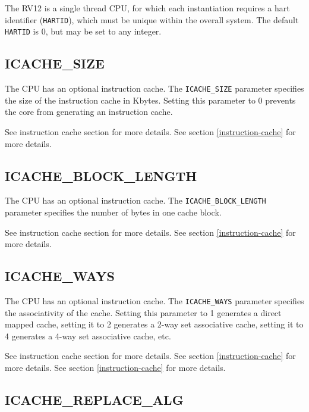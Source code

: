 The RV12 is a single thread CPU, for which each instantiation requires a hart
identifier (\texttt{HARTID}), which must be unique within the overall system.
The default \texttt{HARTID} is 0, but may be set to any integer.

\subsection{ICACHE\_SIZE}\label{icache_size}

The CPU has an optional instruction cache. The \texttt{ICACHE\_SIZE} parameter
specifies the size of the instruction cache in Kbytes. Setting this parameter to
0 prevents the core from generating an instruction cache.

\ifdefined\MARKDOWN
See instruction cache section for more details.
\else
See section \ref{instruction-cache}  for more details.
\fi


\subsection{ICACHE\_BLOCK\_LENGTH}\label{icache_block_length}

The CPU has an optional instruction cache. The \texttt{ICACHE\_BLOCK\_LENGTH}
parameter specifies the number of bytes in one cache block.

\ifdefined\MARKDOWN
See instruction cache section for more details.
\else
See section \ref{instruction-cache}  for more details.
\fi

\subsection{ICACHE\_WAYS}\label{icache_ways}

The CPU has an optional instruction cache. The \texttt{ICACHE\_WAYS} parameter
specifies the associativity of the cache. Setting this parameter to 1 generates
a direct mapped cache, setting it to 2 generates a 2-way set associative cache,
setting it to 4 generates a 4-way set associative cache, etc.

\ifdefined\MARKDOWN
See instruction cache section for more details.
\else
See section \ref{instruction-cache}  for more details.
\fi
See section \ref{instruction-cache}  for more details.

\subsection{ICACHE\_REPLACE\_ALG}\label{icache_replace_alg}

